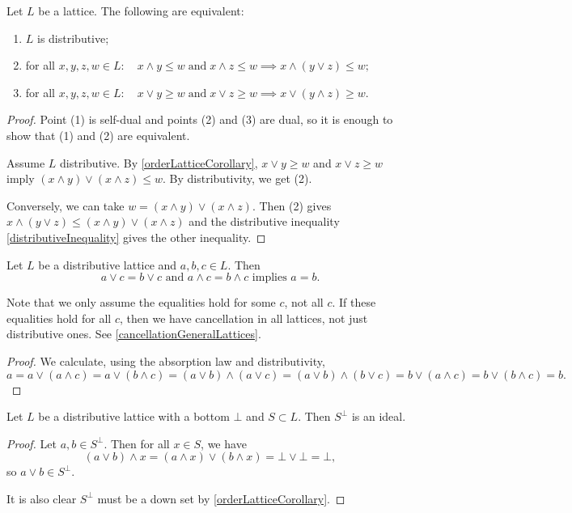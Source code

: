 \begin{lemma}
Let $L$ be a lattice. The following are equivalent:
\begin{enumerate}
\item $L$ is distributive;
\item for all $x,y,z,w\in L: \quad x\wedge y \leq w \;\text{and}\; x\wedge z\leq w \implies x\wedge (y\vee z) \leq w;$
\item for all $x,y,z,w\in L: \quad x\vee y \geq w \;\text{and}\; x\vee z\geq w \implies x\vee (y\wedge z) \geq w$.
\end{enumerate}
\end{lemma}
\begin{proof}
Point (1) is self-dual and points (2) and (3) are dual, so it is enough to show that (1) and (2) are equivalent.

Assume $L$ distributive. By \ref{orderLatticeCorollary}, $ x\vee y \geq w$ and $x\vee z\geq w$ imply $(x\wedge y)\vee (x\wedge z) \leq w$. By distributivity, we get (2).

Conversely, we can take $w = (x\wedge y)\vee (x\wedge z)$. Then (2) gives $x\wedge (y\vee z) \leq (x\wedge y)\vee (x\wedge z)$ and the distributive inequality \ref{distributiveInequality} gives the other inequality. 
\end{proof}

\begin{proposition} \label{cancellationDistributiveLattices}
Let $L$ be a distributive lattice and $a,b,c\in L$. Then
\[ \text{$a\vee c = b \vee c$ and $a\wedge c = b \wedge c$ implies $a = b$.} \]
\end{proposition}
Note that we only assume the equalities hold for some $c$, not all $c$. If these equalities hold for all $c$, then we have cancellation in all lattices, not just distributive ones. See \ref{cancellationGeneralLattices}.
\begin{proof}
We calculate, using the absorption law and distributivity,
\[ a = a\vee (a\wedge c) = a \vee (b\wedge c) = (a\vee b)\wedge (a\vee c) = (a\vee b) \wedge (b\vee c) = b \vee (a \wedge c) = b \vee (b\wedge c) = b. \]
\end{proof}

\begin{lemma} \label{disjointComplementIdeal}
Let $L$ be a distributive lattice with a bottom $\bot$ and $S\subset L$. Then $S^\perp$ is an ideal.
\end{lemma}
\begin{proof}
Let $a,b\in S^\perp$. Then for all $x\in S$, we have
\[ (a\vee b)\wedge x = (a\wedge x)\vee (b\wedge x) = \bot\vee \bot = \bot, \]
so $a\vee b\in S^\perp$.

It is also clear $S^\perp$ must be a down set by \ref{orderLatticeCorollary}.
\end{proof}

